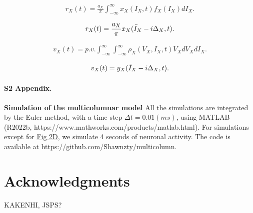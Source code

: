 \documentclass[10pt,letterpaper]{article}
\begin{document}
\begin{eqnarray}
\label{eq:12}
    r_{X}(t)= \frac{a_{X}}{\pi}\int_{-\infty}^{\infty}x_{X}(I_{X},t)f_{X}(I_{X})dI_{X}.
\end{eqnarray}

\begin{eqnarray}
\label{eq:13}
    r_{X}(t)= \frac{a_{X}}{\pi}x_{X}(\Bar{I}_{X}-i\Delta_{X},t).
\end{eqnarray}

\begin{eqnarray}
\label{eq:14}
    v_{X}(t) = p.v.\int_{-\infty}^{\infty}\int_{-\infty}^{\infty}\rho_{X}(V_{X},I_{X},t)V_{X}dV_{X}dI_{X}.
\end{eqnarray}

\begin{eqnarray}
\label{eq:15}
    v_{X}(t) = y_{X}(\Bar{I}_{X}-i\Delta_{X},t).
\end{eqnarray}

\paragraph*{S2 Appendix.}
\label{S2_Appendix}
{\bf Simulation of the multicolumnar model} All the simulations are integrated by the Euler method, with a time step $\Delta t=0.01 (ms)$, using MATLAB (R2022b, https://www.mathworks.com/products/matlab.html). For simulations except for \hyperlink{fig:fig2}{Fig 2D}, we simulate 4 seconds of neuronal activity. The code is available at https://github.com/Shawnzty/multicolumn.

\section*{Acknowledgments}
KAKENHI, JSPS?

\nolinenumbers
\end{document}
